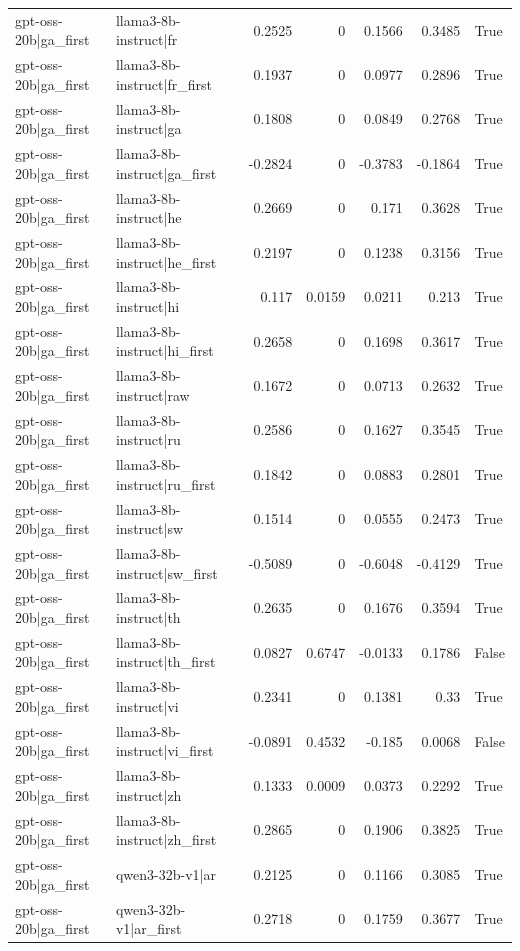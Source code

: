 \begin{table}
\begin{tabular}{l l r r r r l}
gpt-oss-20b|ga_first & llama3-8b-instruct|fr & 0.2525 & 0 & 0.1566 & 0.3485 & True \\
gpt-oss-20b|ga_first & llama3-8b-instruct|fr_first & 0.1937 & 0 & 0.0977 & 0.2896 & True \\
gpt-oss-20b|ga_first & llama3-8b-instruct|ga & 0.1808 & 0 & 0.0849 & 0.2768 & True \\
gpt-oss-20b|ga_first & llama3-8b-instruct|ga_first & -0.2824 & 0 & -0.3783 & -0.1864 & True \\
gpt-oss-20b|ga_first & llama3-8b-instruct|he & 0.2669 & 0 & 0.171 & 0.3628 & True \\
gpt-oss-20b|ga_first & llama3-8b-instruct|he_first & 0.2197 & 0 & 0.1238 & 0.3156 & True \\
gpt-oss-20b|ga_first & llama3-8b-instruct|hi & 0.117 & 0.0159 & 0.0211 & 0.213 & True \\
gpt-oss-20b|ga_first & llama3-8b-instruct|hi_first & 0.2658 & 0 & 0.1698 & 0.3617 & True \\
gpt-oss-20b|ga_first & llama3-8b-instruct|raw & 0.1672 & 0 & 0.0713 & 0.2632 & True \\
gpt-oss-20b|ga_first & llama3-8b-instruct|ru & 0.2586 & 0 & 0.1627 & 0.3545 & True \\
gpt-oss-20b|ga_first & llama3-8b-instruct|ru_first & 0.1842 & 0 & 0.0883 & 0.2801 & True \\
gpt-oss-20b|ga_first & llama3-8b-instruct|sw & 0.1514 & 0 & 0.0555 & 0.2473 & True \\
gpt-oss-20b|ga_first & llama3-8b-instruct|sw_first & -0.5089 & 0 & -0.6048 & -0.4129 & True \\
gpt-oss-20b|ga_first & llama3-8b-instruct|th & 0.2635 & 0 & 0.1676 & 0.3594 & True \\
gpt-oss-20b|ga_first & llama3-8b-instruct|th_first & 0.0827 & 0.6747 & -0.0133 & 0.1786 & False \\
gpt-oss-20b|ga_first & llama3-8b-instruct|vi & 0.2341 & 0 & 0.1381 & 0.33 & True \\
gpt-oss-20b|ga_first & llama3-8b-instruct|vi_first & -0.0891 & 0.4532 & -0.185 & 0.0068 & False \\
gpt-oss-20b|ga_first & llama3-8b-instruct|zh & 0.1333 & 0.0009 & 0.0373 & 0.2292 & True \\
gpt-oss-20b|ga_first & llama3-8b-instruct|zh_first & 0.2865 & 0 & 0.1906 & 0.3825 & True \\
gpt-oss-20b|ga_first & qwen3-32b-v1|ar & 0.2125 & 0 & 0.1166 & 0.3085 & True \\
gpt-oss-20b|ga_first & qwen3-32b-v1|ar_first & 0.2718 & 0 & 0.1759 & 0.3677 & True \\

\end{tabular}
\end{table}
